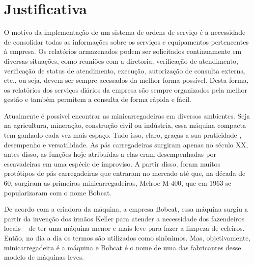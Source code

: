 \chapter{Justificativa}
O motivo da implementação de um sistema de ordens de serviço é a necessidade de consolidar todas as informações sobre os serviços e equipamentos pertencentes à empresa. Os relatórios armazenados podem ser solicitados continuamente em diversas situações, como reuniões com a diretoria, verificação de atendimento, verificação de status de atendimento, execução, autorização de consulta externa, etc., ou seja, devem ser sempre acessados da melhor forma possível. Desta forma, os relatórios dos serviços diários da empresa são sempre organizados pela melhor gestão e também permitem a consulta de forma rápida e fácil. \cite{relatorio}

Atualmente é possível encontrar as minicarregadeiras em diversos ambientes. Seja na agricultura, mineração, construção civil ou indústria, essa máquina compacta tem ganhado cada vez mais espaço. Tudo isso, claro, graças a sua praticidade , desempenho e versatilidade. As pás carregadeiras surgiram apenas no século XX, antes disso, as funções hoje atribuídas a elas eram desempenhadas por escavadeiras em uma espécie de improviso. A partir disso, foram muitos protótipos de pás carregadeiras que entraram no mercado até que, na década de 60, surgiram as primeiras minicarregadeiras, Melroe M-400, que em 1963 se popularizaram com o nome Bobcat.

De acordo com a criadora da máquina, a empresa Bobcat, essa máquina surgiu a partir da invenção dos irmãos Keller para atender a necessidade dos fazendeiros locais – de ter uma máquina menor e mais leve para fazer a limpeza de celeiros. Então, no dia a dia os termos são utilizados como sinônimos. Mas, objetivamente, minicarregadeira é a máquina e Bobcat é o nome de uma das fabricantes desse modelo de máquinas leves. \cite{mini-carregadeiras}
